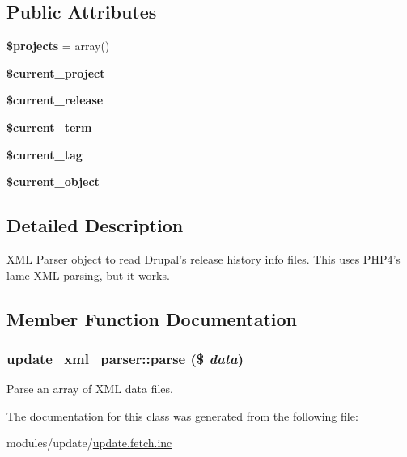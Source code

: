 \subsection*{Public Attributes}
\begin{CompactItemize}
\item 
\hypertarget{classupdate__xml__parser_63ae15720b77ed92aeaad0e70cce6a6a}{
\textbf{\$projects} = array()}
\label{classupdate__xml__parser_63ae15720b77ed92aeaad0e70cce6a6a}

\item 
\hypertarget{classupdate__xml__parser_7406564878377dd5d3c7ec9fc329fdb9}{
\textbf{\$current\_\-project}}
\label{classupdate__xml__parser_7406564878377dd5d3c7ec9fc329fdb9}

\item 
\hypertarget{classupdate__xml__parser_cb438f397fa7ccde4f14da8818438d9e}{
\textbf{\$current\_\-release}}
\label{classupdate__xml__parser_cb438f397fa7ccde4f14da8818438d9e}

\item 
\hypertarget{classupdate__xml__parser_a602ae4598cc038bdb0005685e61b358}{
\textbf{\$current\_\-term}}
\label{classupdate__xml__parser_a602ae4598cc038bdb0005685e61b358}

\item 
\hypertarget{classupdate__xml__parser_e6d02dd9269ced30b05b29e7e4de6d68}{
\textbf{\$current\_\-tag}}
\label{classupdate__xml__parser_e6d02dd9269ced30b05b29e7e4de6d68}

\item 
\hypertarget{classupdate__xml__parser_143b079827af642708fcb590dba535f8}{
\textbf{\$current\_\-object}}
\label{classupdate__xml__parser_143b079827af642708fcb590dba535f8}

\end{CompactItemize}


\subsection{Detailed Description}
XML Parser object to read Drupal's release history info files. This uses PHP4's lame XML parsing, but it works. 

\subsection{Member Function Documentation}
\hypertarget{classupdate__xml__parser_cac986d9576e4ce77eca93abec17ed15}{
\subsubsection[{parse}]{\setlength{\rightskip}{0pt plus 5cm}update\_\-xml\_\-parser::parse (\$ {\em data})}}
\label{classupdate__xml__parser_cac986d9576e4ce77eca93abec17ed15}


Parse an array of XML data files. 

The documentation for this class was generated from the following file:\begin{CompactItemize}
\item 
modules/update/\hyperlink{update_8fetch_8inc}{update.fetch.inc}\end{CompactItemize}
